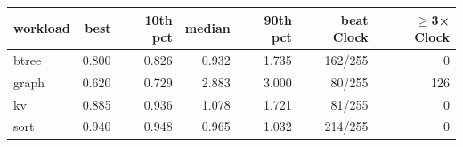 \begin{tabular}{lrrrrrr}
\toprule
workload & best & 10th pct & median & 90th pct & beat Clock & $\geq$3× Clock \\
\midrule
btree & 0.800 & 0.826 & 0.932 & 1.735 & 162/255 & 0 \\
graph & 0.620 & 0.729 & 2.883 & 3.000 & 80/255 & 126 \\
kv & 0.885 & 0.936 & 1.078 & 1.721 & 81/255 & 0 \\
sort & 0.940 & 0.948 & 0.965 & 1.032 & 214/255 & 0 \\
\bottomrule
\end{tabular}
